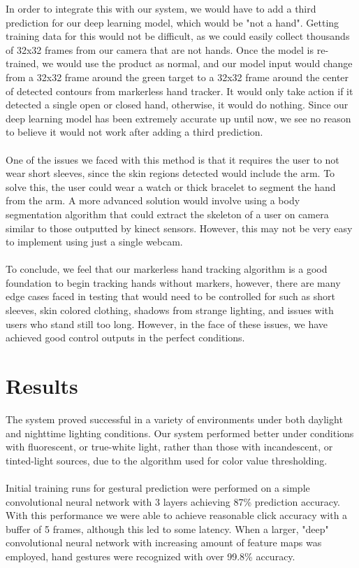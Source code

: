 \documentclass[twoside,twocolumn]{article}
\begin{document}
In order to integrate this with our system, we would have to add a third prediction for our deep learning model, which would be "not a hand". Getting training data for this would not be difficult, as we could easily collect thousands of 32x32 frames from our camera that are not hands. Once the model is re-trained, we would use the product as normal, and our model input would change from a 32x32 frame around the green target to a 32x32 frame around the center of detected contours from markerless hand tracker. It would only take action if it detected a single open or closed hand, otherwise, it would do nothing. Since our deep learning model has been extremely accurate up until now, we see no reason to believe it would not work after adding a third prediction.\\ \\
One of the issues we faced with this method is that it requires the user to not wear short sleeves, since the skin regions detected would include the arm. To solve this, the user could wear a watch or thick bracelet to segment the hand from the arm. A more advanced solution would involve using a body segmentation algorithm that could extract the skeleton of a user on camera similar to those outputted by kinect sensors. However, this may not be very easy to implement using just a single webcam. \\ \\
To conclude, we feel that our markerless hand tracking algorithm is a good foundation to begin tracking hands without markers, however, there are many edge cases faced in testing that would need to be controlled for such as short sleeves, skin colored clothing, shadows from strange lighting, and issues with users who stand still too long. However, in the face of these issues, we have achieved good control outputs in the perfect conditions.

\section{Results}
The system proved successful in a variety of environments under both daylight and nighttime lighting conditions. Our system performed better under conditions with fluorescent, or true-white light, rather than those with incandescent, or tinted-light sources, due to the algorithm used for color value thresholding. \\ \\Initial training runs for gestural prediction were performed on a simple convolutional neural network with 3 layers achieving 87\% prediction accuracy. With this performance we were able to achieve reasonable click accuracy with a buffer of 5 frames, although this led to some latency. When a larger, "deep" convolutional neural network with increasing amount of feature maps was employed, hand gestures were recognized with over 99.8\% accuracy. 
\end{document}

